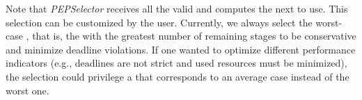 Note that \textit{PEPSelector} receives all the valid \plans and computes the next \plan to use. This selection can be customized by the user. Currently, we always select the worst-case \plan, that is, the \plan with the greatest number of remaining stages to be conservative and minimize deadline violations. If one wanted to optimize different performance indicators (e.g., deadlines are not strict and used resources must be minimized), the selection could privilege a \plan that corresponds to an average case instead of the worst one.



